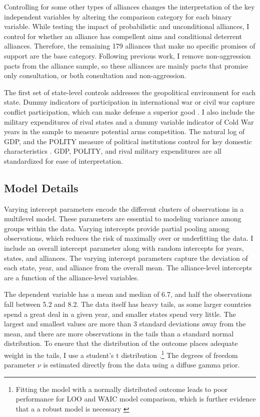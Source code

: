 \documentclass[12pt]{article}
\begin{document}
Controlling for some other types of alliances changes the interpretation of the key independent variables by altering the comparison category for each binary variable. While testing the impact of probabilistic and unconditional alliances, I control for whether an alliance has compellent aims and conditional deterrent alliances. Therefore, the remaining 179 alliances that make no specific promises of support are the base category. Following previous work, I remove non-aggression pacts from the alliance sample, so these alliances are mainly pacts that promise only consultation, or both consultation and non-aggression. 

The first set of state-level controls addresses the geopolitical environment for each state. Dummy indicators of participation in international war or civil war capture conflict participation, which can make defense a superior good \citep{OlsonZeckhauser1966}. I also include the military expenditures of rival states and a dummy variable indicator of Cold War years in the sample to measure potential arms competition. The natural log of GDP, and the POLITY measure of political institutions control for key domestic characteristics \citep{FordhamWalker2005}. GDP, POLITY, and rival military expenditures are all standardized for ease of interpretation. 


\subsection*{Model Details}

Varying intercept parameters encode the different clusters of observations in a multilevel model. These parameters are essential to modeling variance among groups within the data. Varying intercepts provide partial pooling among observations, which reduces the risk of maximally over or underfitting the data. I include an overall intercept parameter along with random intercepts for years, states, and alliances. The varying intercept parameters capture the deviation of each state, year, and alliance from the overall mean. The alliance-level intercepts are a function of the alliance-level variables. 

The dependent variable has a mean and median of 6.7, and half the observations fall between 5.2 and 8.2. The data itself has heavy tails, as some larger countries spend a great deal in a given year, and smaller states spend very little. The largest and smallest values are more than 3 standard deviations away from the mean, and there are more observations in the tails than a standard normal distribution. To ensure that the distribution of the outcome places adequate weight in the tails, I use a student's t distribution \citep{JuarezSteele2010}.\footnote{Fitting the model with a normally distributed outcome leads to poor performance for LOO and WAIC model comparison, which is further evidence that a a robust model is necessary \citep{Vehtarietal2017}}  The degrees of freedom parameter $\nu$ is estimated directly from the data using a diffuse gamma prior.
\end{document}
